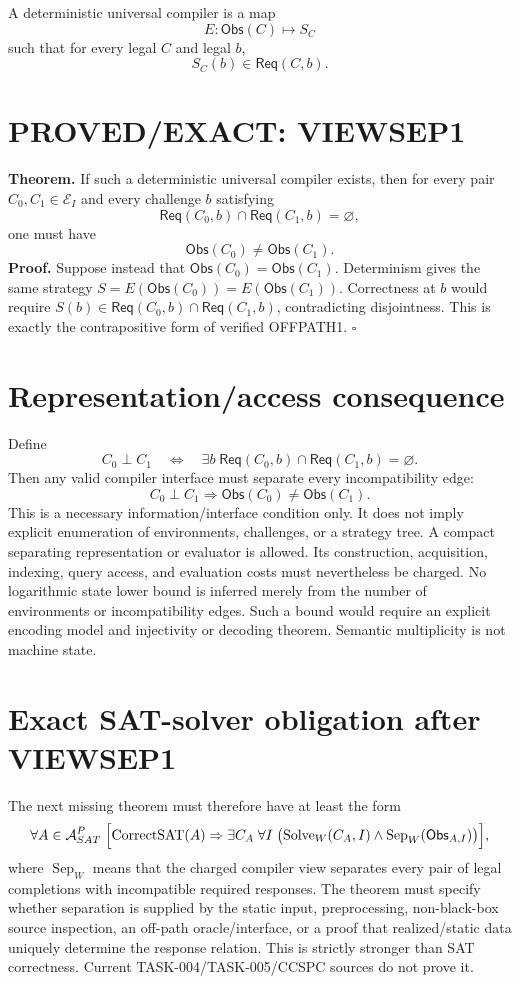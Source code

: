 \documentclass[11pt]{article}
\begin{document}
A deterministic universal compiler is a map
\[
E:\mathsf{Obs}(C)\mapsto S_C
\]
such that for every legal $C$ and legal $b$,
\[
S_C(b)\in\mathsf{Req}(C,b).
\]

\section*{PROVED/EXACT: VIEWSEP1}
\textbf{Theorem.} If such a deterministic universal compiler exists, then for every pair $C_0,C_1\in\mathcal E_I$ and every challenge $b$ satisfying
\[
\mathsf{Req}(C_0,b)\cap\mathsf{Req}(C_1,b)=\varnothing,
\]
one must have
\[
\mathsf{Obs}(C_0)\ne\mathsf{Obs}(C_1).
\]
\textbf{Proof.} Suppose instead that $\mathsf{Obs}(C_0)=\mathsf{Obs}(C_1)$. Determinism gives the same strategy $S=E(\mathsf{Obs}(C_0))=E(\mathsf{Obs}(C_1))$. Correctness at $b$ would require $S(b)\in\mathsf{Req}(C_0,b)\cap\mathsf{Req}(C_1,b)$, contradicting disjointness. This is exactly the contrapositive form of verified OFFPATH1. $\square$

\section*{Representation/access consequence}
Define
\[
C_0\perp C_1
\quad\Longleftrightarrow\quad
\exists b\;\mathsf{Req}(C_0,b)\cap\mathsf{Req}(C_1,b)=\varnothing.
\]
Then any valid compiler interface must separate every incompatibility edge:
\[
C_0\perp C_1\Longrightarrow \mathsf{Obs}(C_0)\ne\mathsf{Obs}(C_1).
\]
This is a necessary information/interface condition only. It does not imply explicit enumeration of environments, challenges, or a strategy tree. A compact separating representation or evaluator is allowed. Its construction, acquisition, indexing, query access, and evaluation costs must nevertheless be charged. No logarithmic state lower bound is inferred merely from the number of environments or incompatibility edges. Such a bound would require an explicit encoding model and injectivity or decoding theorem. Semantic multiplicity is not machine state.

\section*{Exact SAT-solver obligation after VIEWSEP1}
The next missing theorem must therefore have at least the form
\[
\forall A\in{\cal A}^{P}_{SAT}\;
\Bigl[
\operatorname{CorrectSAT}(A)
\Rightarrow
\exists C_A\;\forall I\;
\bigl(
\operatorname{Solve}_{W}(C_A,I)
\wedge
\operatorname{Sep}_{W}(\mathsf{Obs}_{A,I})
\bigr)
\Bigr],
\]
where $\operatorname{Sep}_{W}$ means that the charged compiler view separates every pair of legal completions with incompatible required responses. The theorem must specify whether separation is supplied by the static input, preprocessing, non-black-box source inspection, an off-path oracle/interface, or a proof that realized/static data uniquely determine the response relation. This is strictly stronger than SAT correctness. Current TASK-004/TASK-005/CCSPC sources do not prove it.
\end{document}
